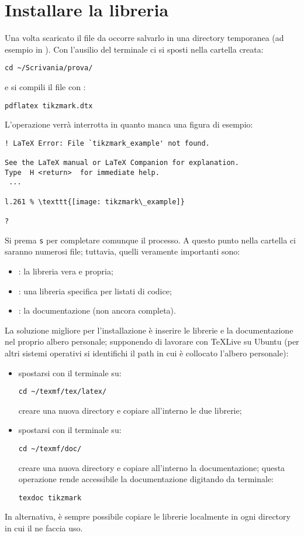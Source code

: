 \chapter{Installare la libreria}
\label{chap:install}

Una volta scaricato il file  da  occorre salvarlo in una directory temporanea (ad esempio in ). Con l'ausilio del terminale ci si sposti nella cartella creata:
\begin{verbatim}
cd ~/Scrivania/prova/
\end{verbatim}
e si compili il file  con :
\begin{verbatim}
pdflatex tikzmark.dtx
\end{verbatim}
L'operazione verrà interrotta in quanto manca una figura di esempio:
\begin{verbatim}
! LaTeX Error: File `tikzmark_example' not found.

See the LaTeX manual or LaTeX Companion for explanation.
Type  H <return>  for immediate help.
 ...                                              
                                                  
l.261 % \texttt{[image: tikzmark\_example]}
                                          
?
\end{verbatim}
Si prema \verb!s! per completare comunque il processo. A questo punto nella cartella  ci saranno numerosi file; tuttavia, quelli veramente importanti sono:
\begin{itemize}
\item {}: la libreria vera e propria;
\item {}: una libreria specifica per listati di codice;
\item {}: la documentazione (non ancora completa).
\end{itemize}
La soluzione migliore per l'installazione è inserire le librerie e la documentazione nel proprio albero personale; supponendo di lavorare con \TeX Live su Ubuntu (per altri sistemi operativi si identifichi il path in cui è collocato l'albero personale):
\begin{itemize}
\item spostarsi con il terminale su:
\begin{verbatim}
cd ~/texmf/tex/latex/
\end{verbatim}
creare una nuova directory  e copiare all'interno le due librerie;
\item spostarsi con il terminale su:
\begin{verbatim}
cd ~/texmf/doc/
\end{verbatim}
creare una nuova directory  e copiare all'interno la documentazione; questa operazione rende accessibile la documentazione digitando da terminale:
\begin{verbatim}
texdoc tikzmark
\end{verbatim}
\end{itemize}
In alternativa, è sempre possibile copiare le librerie localmente in ogni directory in cui il  ne faccia uso.
